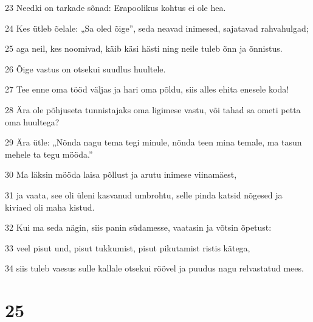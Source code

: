 \par 23 Needki on tarkade sõnad: Erapoolikus kohtus ei ole hea.
\par 24 Kes ütleb õelale: „Sa oled õige”, seda neavad inimesed, sajatavad rahvahulgad;
\par 25 aga neil, kes noomivad, käib käsi hästi ning neile tuleb õnn ja õnnistus.
\par 26 Õige vastus on otsekui suudlus huultele.
\par 27 Tee enne oma tööd väljas ja hari oma põldu, siis alles ehita enesele koda!
\par 28 Ära ole põhjuseta tunnistajaks oma ligimese vastu, või tahad sa ometi petta oma huultega?
\par 29 Ära ütle: „Nõnda nagu tema tegi minule, nõnda teen mina temale, ma tasun mehele ta tegu mööda.”
\par 30 Ma läksin mööda laisa põllust ja arutu inimese viinamäest,
\par 31 ja vaata, see oli üleni kasvanud umbrohtu, selle pinda katsid nõgesed ja kiviaed oli maha kistud.
\par 32 Kui ma seda nägin, siis panin südamesse, vaatasin ja võtsin õpetust:
\par 33 veel pisut und, pisut tukkumist, pisut pikutamist ristis kätega,
\par 34 siis tuleb vaesus sulle kallale otsekui röövel ja puudus nagu relvastatud mees.

\chapter{25}


